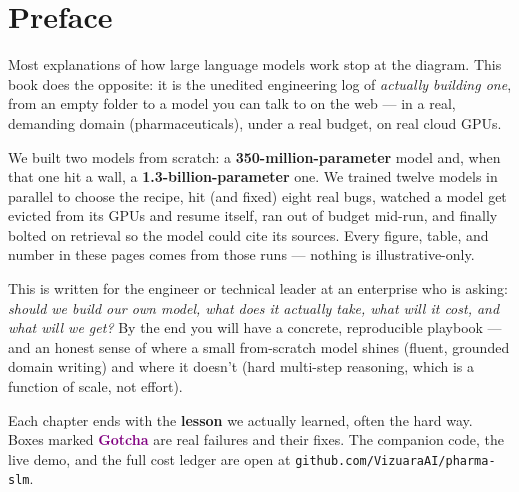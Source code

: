\chapter*{Preface}

\noindent Most explanations of how large language models work stop at the diagram. This book does the
opposite: it is the unedited engineering log of \emph{actually building one}, from an empty folder to a
model you can talk to on the web --- in a real, demanding domain (pharmaceuticals), under a real budget,
on real cloud GPUs.

\medskip
\noindent We built two models from scratch: a \textbf{350-million-parameter} model and, when that one hit a
wall, a \textbf{1.3-billion-parameter} one. We trained twelve models in parallel to choose the recipe, hit
(and fixed) eight real bugs, watched a model get evicted from its GPUs and resume itself, ran out of budget
mid-run, and finally bolted on retrieval so the model could cite its sources. Every figure, table, and
number in these pages comes from those runs --- nothing is illustrative-only.

\medskip
\noindent This is written for the engineer or technical leader at an enterprise who is asking: \emph{should
we build our own model, what does it actually take, what will it cost, and what will we get?} By the end you
will have a concrete, reproducible playbook --- and an honest sense of where a small from-scratch model
shines (fluent, grounded domain writing) and where it doesn't (hard multi-step reasoning, which is a function
of scale, not effort).

\begin{lesson}
Each chapter ends with the \textbf{lesson} we actually learned, often the hard way. Boxes marked
\textcolor{purple}{\textbf{Gotcha}} are real failures and their fixes. The companion code, the live demo,
and the full cost ledger are open at \texttt{github.com/VizuaraAI/pharma-slm}.
\end{lesson}

\cleardoublepage
